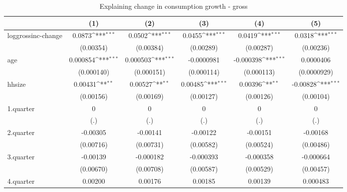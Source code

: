 \begin{table}[htbp]\centering
\def\sym#1{\ifmmode^{#1}\else\(^{#1}\)\fi}
\caption{\label{tab:log2.2B-deltacons-gross} Explaining change in consumption growth - gross}
\begin{tabular}{l*{5}{c}}
\hline\hline
            &\multicolumn{1}{c}{(1)}         &\multicolumn{1}{c}{(2)}         &\multicolumn{1}{c}{(3)}         &\multicolumn{1}{c}{(4)}         &\multicolumn{1}{c}{(5)}         \\
\hline
loggrossinc-change&      0.0873\sym{***}&      0.0502\sym{***}&      0.0455\sym{***}&      0.0419\sym{***}&      0.0318\sym{***}\\
            &   (0.00354)         &   (0.00384)         &   (0.00289)         &   (0.00287)         &   (0.00236)         \\
age         &    0.000854\sym{***}&    0.000503\sym{***}&  -0.0000981         &   -0.000398\sym{***}&   0.0000406         \\
            &  (0.000140)         &  (0.000151)         &  (0.000114)         &  (0.000113)         & (0.0000929)         \\
hhsize      &     0.00431\sym{**} &     0.00527\sym{**} &     0.00485\sym{***}&     0.00396\sym{**} &    -0.00828\sym{***}\\
            &   (0.00156)         &   (0.00169)         &   (0.00127)         &   (0.00126)         &   (0.00104)         \\
1.quarter   &           0         &           0         &           0         &           0         &           0         \\
            &         (.)         &         (.)         &         (.)         &         (.)         &         (.)         \\
2.quarter   &    -0.00305         &    -0.00141         &    -0.00122         &    -0.00151         &    -0.00168         \\
            &   (0.00716)         &   (0.00731)         &   (0.00582)         &   (0.00524)         &   (0.00486)         \\
3.quarter   &    -0.00139         &   -0.000182         &   -0.000393         &   -0.000358         &   -0.000664         \\
            &   (0.00670)         &   (0.00708)         &   (0.00587)         &   (0.00529)         &   (0.00457)         \\
4.quarter   &     0.00200         &     0.00176         &     0.00185         &     0.00139         &    0.000483         \\

\end{tabular}
\end{table}
